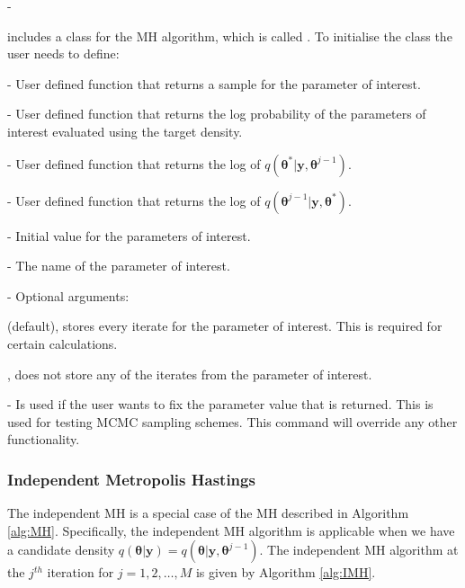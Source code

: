 -\documentclass[article]{jss}
\begin{document}
 includes a class for the MH algorithm, which is called
.  To initialise the class the user needs to define:
\begin{description} 
\item {} - User defined function that returns a sample for
  the parameter of interest.
\item {} - User defined function that returns the log
  probability of the parameters of interest evaluated using the target
  density.
\item {} - User defined function that returns the log
  of $q\left(\bm{\theta}^{\ast}|\bm{y},\bm{\theta}^{j-1}\right).$
\item {} - User defined function that returns the log
  of $q\left(\bm{\theta}^{j-1}|\bm{y},\bm{\theta}^{*}\right).$
\item {} - Initial value for the parameters of
  interest.
\item {} - The name of the parameter of interest.
\item {} - Optional arguments:

  \begin{description}
  \item {}
    \begin{description}  
    \item {} (default), stores every iterate for the parameter
      of interest. This is required for certain calculations.
    \item {}, does not store any of the iterates from the parameter of
      interest.
    \end{description}
  \item {} - Is used if the user wants to fix the
    parameter value that is returned. This is used for testing MCMC
    sampling schemes.  This command will override any other
    functionality.
  \end{description}
\end{description}
\subsubsection{Independent Metropolis Hastings}

The independent MH is a special case of the MH 
described in Algorithm \ref{alg:MH}. Specifically, the
independent MH algorithm is applicable when we have a candidate
density
$q(\bm{\theta}|\bm{y})=q(\bm{\theta}|\bm{y},\bm{\theta}^{j-1})$.  The
independent MH algorithm at the $j^{th}$ iteration for
$j=1,2,\ldots,M$ is given by Algorithm \ref{alg:IMH}.
\end{document}
